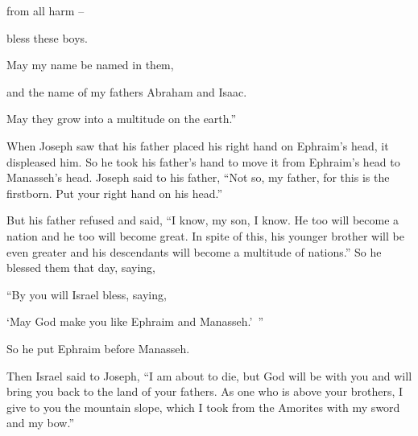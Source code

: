 {\par }{\Q from all
harm
–
\par }{\Q bless
these boys.
\par }{\Q May my name
be named
in them,
\par }{\Q and the name
of my fathers
Abraham
and Isaac.
\par }{\Q May they grow
into a multitude
on the earth.”
\par }{\PP {}When Joseph
saw
that
his father
placed
his right hand
on
Ephraim’s
head,
it displeased
him. So he took
his father’s
hand
to move
it from Ephraim’s
head
to Manasseh’s
head.
Joseph
said
to
his father,
“Not
so,
my father,
for
this
is the firstborn.
Put
your right hand
on
his head.”
\par }{\PP {}But his father
refused
and said,
“I know,
my son,
I know.
He too
will become
a nation
and he too
will become great.
In spite
of this, his younger
brother
will be even greater
and his descendants
will become
a multitude
of nations.”
So he blessed
them that day,
saying,
\par }{\Q “By you will Israel
bless,
saying,
\par }{\Q ‘May God
make
you like Ephraim
and Manasseh.’ ”
\par }{\PP So he put
Ephraim
before
Manasseh.
\par }{\PP {}Then Israel
said to
Joseph,
“I
am
about to die,
but God
will be
with
you and will bring you back
to
the land
of your fathers.
As one
who is above
your brothers,
I
give
to you the mountain slope,
which
I took
from
the Amorites
with my sword
and my bow.”

}

